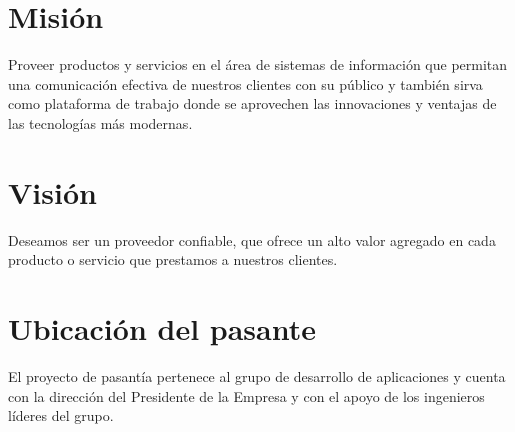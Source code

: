 \section{Misión}
Proveer productos y servicios en el área de sistemas de información que permitan una comunicación efectiva de nuestros clientes con su público y también sirva como plataforma de trabajo donde se aprovechen las innovaciones y ventajas de las tecnologías más modernas.

\section{Visión}
Deseamos ser un proveedor confiable, que ofrece un alto valor agregado en cada producto o servicio que prestamos a nuestros clientes.

\section{Ubicación del pasante}
El proyecto de pasantía pertenece al grupo de desarrollo de aplicaciones y cuenta con la dirección del Presidente de la Empresa y con el apoyo de los ingenieros líderes del grupo.